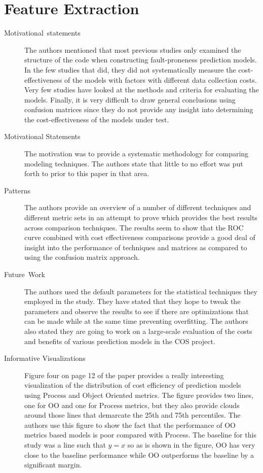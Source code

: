 \documentclass[english]{article}
\begin{document}
\section*{Feature Extraction}
\begin{description}
\item [{Motivational~statements}] The authors mentioned that most previous
studies only examined the structure of the code when constructing
fault-proneness prediction models. In the few studies that did, they
did not systematically measure the cost-effectiveness of the models
with factors with different data collection costs. Very few studies
have looked at the methods and criteria for evaluating the models.
Finally, it is very difficult to draw general conclusions using confusion
matrices since they do not provide any insight into determining the
cost-effectiveness of the models under test.

\item[{Motivational Statements}]  The motivation was to provide a systematic methodology for comparing modeling techniques.  The authors state that little to no effort was put forth to prior to this paper in that area.  

\item[{Patterns}]  The authors provide an overview of a number of different techniques and different metric sets in an attempt to prove which provides the best results across comparison techniques.  The results seem to show that the ROC curve combined with cost effectiveness comparisons provide a good deal of insight into the performance of techniques and matrices as compared to using the confusion matrix approach.

\item [{Future~Work}] The authors used the default parameters for the
statistical techniques they employed in the study. They have stated
that they hope to tweak the parameters and observe the results to
see if there are optimizations that can be made while at the same
time preventing overfitting. The authors also stated they are going
to work on a large-scale evaluation of the costs and benefits of various
prediction models in the COS project.

\item[{Informative Visualizations}]  Figure four on page 12 of the paper provides a really interesting visualization of the distribution of cost efficiency of prediction models using Process and Object Oriented metrics.  The figure provides two lines, one for OO and one for Process metrics, but they also provide clouds around those lines that demarcate the 25th and 75th percentiles.  The authors use this figure to show the fact that the performance of OO metrics based models is poor compared with Process.  The baseline for this study was a line such that $y=x$ so as is shown in the figure, OO has very close to the baseline performance while OO outperforms the baseline by a significant margin.
\end{description}
\end{document}

